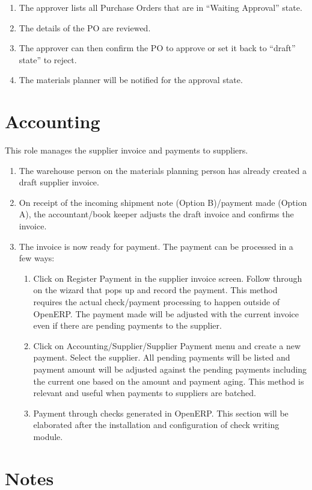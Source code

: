 \begin{enumerate}
\item The approver lists all Purchase Orders that are in “Waiting Approval” state.
\item The details of the PO are reviewed.
\item The approver can then confirm the PO  to approve or set it back to “draft” state” to reject.
\item The materials planner will be notified for the approval state.
\end{enumerate}

\section{Accounting}

This role manages the supplier invoice and payments to suppliers.
\begin{enumerate}
\item The warehouse person on the materials planning person has already created a draft supplier invoice.
\item On receipt of the incoming shipment note (Option B)/payment made (Option A), the accountant/book keeper adjusts the draft invoice and confirms the invoice.
\item The invoice is now ready for payment. The payment can be processed in a few ways:
  \begin{enumerate}
  \item Click on Register Payment in the supplier invoice screen. Follow through on the wizard that pops up and record the payment. This method requires the actual check/payment processing to happen outside of OpenERP. The payment made will be adjusted with the current invoice even if there are pending payments to the supplier.
  \item Click on Accounting/Supplier/Supplier Payment menu and create a new payment. Select the supplier. All pending payments will be listed and payment amount will be adjusted against the pending payments including the current one based on the amount and payment aging. This method is relevant and useful when payments to suppliers are batched.
  \item Payment through checks generated in OpenERP. This section will be elaborated after the installation and configuration of check writing module. 
  \end{enumerate}
\end{enumerate}

\section{Notes}

